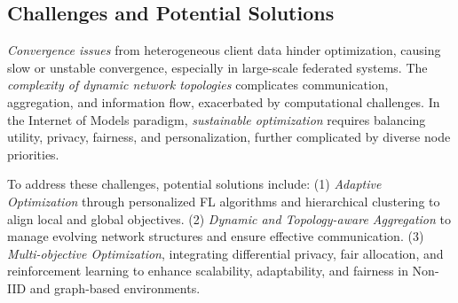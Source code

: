 \subsection{Challenges and Potential Solutions}


\textit{Convergence issues} from heterogeneous client data hinder optimization, causing slow or unstable convergence, especially in large-scale federated systems. The \textit{complexity of dynamic network topologies} complicates communication, aggregation, and information flow, exacerbated by computational challenges. In the Internet of Models paradigm, \textit{sustainable optimization} requires balancing utility, privacy, fairness, and personalization, further complicated by diverse node priorities.

To address these challenges, potential solutions include: (1) \textit{Adaptive Optimization} through personalized FL algorithms and hierarchical clustering to align local and global objectives. (2) \textit{Dynamic and Topology-aware Aggregation} to manage evolving network structures and ensure effective communication. (3) \textit{Multi-objective Optimization}, integrating differential privacy, fair allocation, and reinforcement learning to enhance scalability, adaptability, and fairness in Non-IID and graph-based environments.
